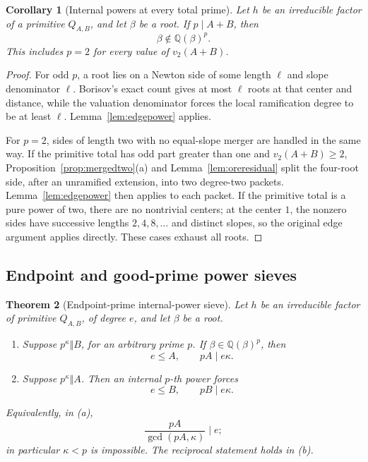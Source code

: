 \documentclass[11pt]{article}
\numberwithin{equation}{section}
\newtheorem{theorem}{Theorem}[section]
\newtheorem{corollary}[theorem]{Corollary}
\theoremstyle{definition}
\newcommand{\Q}{\mathbb Q}
\begin{document}
\begin{corollary}[Internal powers at every total prime]
\label{cor:totalprimepower}
Let \(h\) be an irreducible factor of a primitive \(Q_{A,B}\), and let
\(\beta\) be a root.  If \(p\mid A+B\), then
\[
 \beta\notin\Q(\beta)^p.
\]
This includes \(p=2\) for every value of \(v_2(A+B)\).
\end{corollary}

\begin{proof}
For odd \(p\), a root lies on a Newton side of some length \(\ell\) and
slope denominator \(\ell\).  Borisov's exact count gives at most \(\ell\)
roots at that center and distance, while the valuation denominator forces
the local ramification degree to be at least \(\ell\).
Lemma~\ref{lem:edgepower} applies.

For \(p=2\), sides of length two with no equal-slope merger are handled in
the same way.  If the primitive total has odd part greater than one and
\(v_2(A+B)\geq2\), Proposition~\ref{prop:mergedtwo}(a) and
Lemma~\ref{lem:oreresidual} split the four-root side, after an unramified
extension, into two degree-two packets.  Lemma~\ref{lem:edgepower} then
applies to each packet.  If the primitive total is a pure power of two,
there are no nontrivial centers; at the center \(1\), the nonzero sides have
successive lengths \(2,4,8,\ldots\) and distinct slopes, so the original
edge argument applies directly.  These cases exhaust all roots.
\end{proof}

\subsection{Endpoint and good-prime power sieves}

\begin{theorem}[Endpoint-prime internal-power sieve]
\label{thm:endpointpower}
Let \(h\) be an irreducible factor of primitive \(Q_{A,B}\), of degree
\(e\), and let \(\beta\) be a root.
\begin{enumerate}[label=(\alph*)]
\item Suppose \(p^\kappa\Vert B\), for an arbitrary prime \(p\).  If
\(\beta\in\Q(\beta)^p\), then
\begin{equation}
 e\leq A,\qquad pA\mid e\kappa.
 \label{eq:15-5}
\end{equation}
\item Suppose \(p^\kappa\Vert A\).  Then an internal \(p\)-th power
forces
\begin{equation}
 e\leq B,\qquad pB\mid e\kappa.
 \label{eq:15-6}
\end{equation}
\end{enumerate}
Equivalently, in (a),
\[
 \frac{pA}{\gcd(pA,\kappa)}\mid e;
\]
in particular \(\kappa<p\) is impossible.  The reciprocal statement holds
in (b).
\end{theorem}
\end{document}
